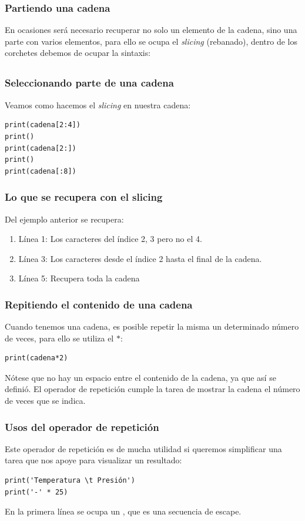 \documentclass[12pt]{beamer}
\begin{document}
\begin{frame}
\frametitle{Partiendo una cadena}
En ocasiones será necesario recuperar no solo un elemento de la cadena, sino una parte con varios elementos, para ello se ocupa el \emph{slicing} (rebanado), dentro de los corchetes debemos de ocupar la sintaxis:
\pause
\begin{align*}
[ \, \mbox{índice inicial} \, : \, \mbox{índice final} \, ]
\end{align*}
\end{frame}
\begin{frame}[fragile]
\frametitle{Seleccionando parte de una cadena}
Veamos como hacemos el \emph{slicing} en nuestra cadena:
\pause
\begin{lstlisting}[caption=Haciendo una selección dentro de la cadena]
print(cadena[2:4])
print()
print(cadena[2:])
print()
print(cadena[:8])
\end{lstlisting}
\end{frame}
\begin{frame}
\frametitle{Lo que se recupera con el slicing}
Del ejemplo anterior se recupera:
\begin{enumerate}[<+->]
\item Línea 1: Los caracteres del índice 2, 3 pero no el 4.
\item Línea 3: Los caracteres desde el índice 2 hasta el final de la cadena.
\item Línea 5: Recupera toda la cadena
\end{enumerate}
\end{frame}
\begin{frame}[fragile]
\frametitle{Repitiendo el contenido de una cadena}
Cuando tenemos una cadena, es posible repetir la misma un determinado número de veces, para ello se utiliza el  $*$:
\pause
\begin{lstlisting}[caption=El operador de repetición de cadenas]
print(cadena*2)
\end{lstlisting}
\pause
Nótese que no hay un espacio entre el contenido de la cadena, ya que así se definió. \pause El operador de repetición cumple la tarea de mostrar la cadena el número de veces que se indica.
\end{frame}
\begin{frame}[fragile]
\frametitle{Usos del operador de repetición}
Este operador de repetición es de mucha utilidad si queremos simplificar una tarea que nos apoye para visualizar un resultado:
\pause
\begin{lstlisting}[caption=Ejemplo de repetición de un caracter]
print('Temperatura \t Presión')
print('-' * 25)
\end{lstlisting}
\pause
En la primera línea se ocupa un , que es una secuencia de escape.
\end{frame}
\end{document}
